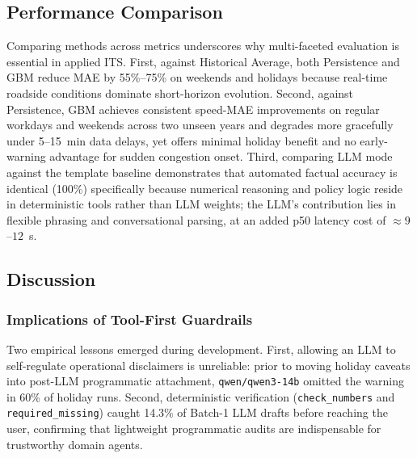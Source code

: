 \documentclass[conference]{IEEEtran}
\begin{document}
\subsection{Performance Comparison}
Comparing methods across metrics underscores why multi-faceted evaluation is essential in applied ITS. First, against Historical Average, both Persistence and GBM reduce MAE by 55\%--75\% on weekends and holidays because real-time roadside conditions dominate short-horizon evolution. Second, against Persistence, GBM achieves consistent speed-MAE improvements on regular workdays and weekends across two unseen years and degrades more gracefully under 5--15~min data delays, yet offers minimal holiday benefit and no early-warning advantage for sudden congestion onset. Third, comparing LLM mode against the template baseline demonstrates that automated factual accuracy is identical (100\%) specifically because numerical reasoning and policy logic reside in deterministic tools rather than LLM weights; the LLM's contribution lies in flexible phrasing and conversational parsing, at an added p50 latency cost of $\approx 9$--$12$~s.

\subsection{Discussion}
\subsubsection{Implications of Tool-First Guardrails}
Two empirical lessons emerged during development. First, allowing an LLM to self-regulate operational disclaimers is unreliable: prior to moving holiday caveats into post-LLM programmatic attachment, \texttt{qwen/qwen3-14b} omitted the warning in 60\% of holiday runs. Second, deterministic verification (\texttt{check\_numbers} and \texttt{required\_missing}) caught 14.3\% of Batch-1 LLM drafts before reaching the user, confirming that lightweight programmatic audits are indispensable for trustworthy domain agents.
\end{document}
